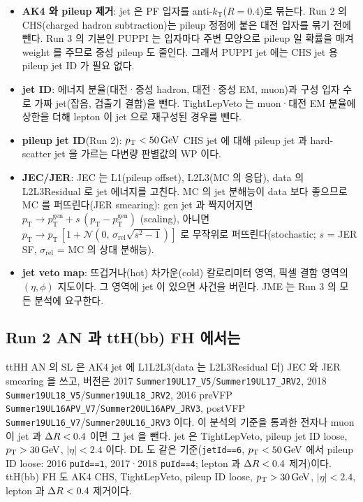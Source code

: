 \begin{itemize}
\item \textbf{AK4 와 pileup 제거}: jet 은 PF 입자를 anti-$k_\text{T}$($R=0.4$)로 묶는다. Run 2 의 CHS(charged hadron subtraction)는 pileup 정점에
  붙은 대전 입자를 묶기 전에 뺀다. Run 3 의 기본인 PUPPI 는 입자마다 주변 모양으로 pileup 일 확률을 매겨 weight 를 주므로 중성 pileup 도
  줄인다. 그래서 PUPPI jet 에는 CHS jet 용 pileup jet ID 가 필요 없다.
\item \textbf{jet ID}: 에너지 분율(대전·중성 hadron, 대전·중성 EM, muon)과 구성 입자 수로 가짜 jet(잡음, 검출기 결함)을 뺀다. TightLepVeto 는
  muon·대전 EM 분율에 상한을 더해 lepton 이 jet 으로 재구성된 경우를 뺀다.
\item \textbf{pileup jet ID}(Run 2): $p_{\mathrm{T}}<50\,\mathrm{GeV}$ CHS jet 에 대해 pileup jet 과 hard-scatter jet 을 가르는 다변량 판별값의 WP 이다.
\item \textbf{JEC/JER}: JEC 는 L1(pileup offset), L2L3(MC 의 응답), data 의 L2L3Residual 로 jet 에너지를 고친다. MC 의 jet \pt{} 분해능이
  data 보다 좋으므로 MC 를 퍼뜨린다(JER smearing): gen jet 과 짝지어지면 $p_\text{T} \to p_\text{T}^\text{gen} + s\,(p_\text{T}-p_\text{T}^\text{gen})$
  (scaling), 아니면 $p_\text{T} \to p_\text{T}\,[1+\mathcal{N}(0,\, \sigma_\text{rel}\sqrt{s^2-1})]$ 로 무작위로 퍼뜨린다(stochastic; $s$ = JER SF,
  $\sigma_\text{rel}$ = MC 의 상대 분해능).
\item \textbf{jet veto map}: 뜨겁거나(hot) 차가운(cold) 칼로리미터 영역, 픽셀 결함 영역의 $(\eta,\phi)$ 지도이다. 그 영역에 jet 이 있으면 사건을
  버린다. JME 는 Run 3 의 모든 분석에 요구한다.
\end{itemize}

\subsection{Run 2 AN 과 ttH(bb) FH 에서는}\label{sec:objects-jets-an}

ttHH AN 의 SL 은 AK4 jet 에 L1L2L3(data 는 L2L3Residual 더) JEC 와 JER smearing 을 쓰고, 버전은 2017 \texttt{Summer19UL17\_V5}/\texttt{Summer19UL17\_JRV2},
2018 \texttt{Summer19UL18\_V5}/\texttt{Summer19UL18\_JRV2}, 2016 preVFP \texttt{Summer19UL16APV\_V7}/\texttt{Summer20UL16APV\_JRV3}, postVFP
\texttt{Summer19UL16\_V7}/\texttt{Summer20UL16\_JRV3} 이다. 이 분석의 기준을 통과한 전자나 muon 이 jet 과 $\Delta R<0.4$ 이면 그 jet 을 뺀다. jet 은
TightLepVeto, pileup jet ID loose, $p_{\mathrm{T}}>30\,\mathrm{GeV}$, $|\eta|<2.4$ 이다. DL 도 같은 기준(\texttt{jetId==6},
$p_{\mathrm{T}}<50\,\mathrm{GeV}$ 에서 pileup ID loose: 2016 \texttt{puId==1}, 2017·2018 \texttt{puId==4}; lepton 과 $\Delta R<0.4$ 제거)이다. ttH(bb) FH 도 AK4 CHS, TightLepVeto, pileup ID loose, $p_{\mathrm{T}}>30\,\mathrm{GeV}$, $|\eta|<2.4$, lepton 과 $\Delta R<0.4$ 제거이다.

